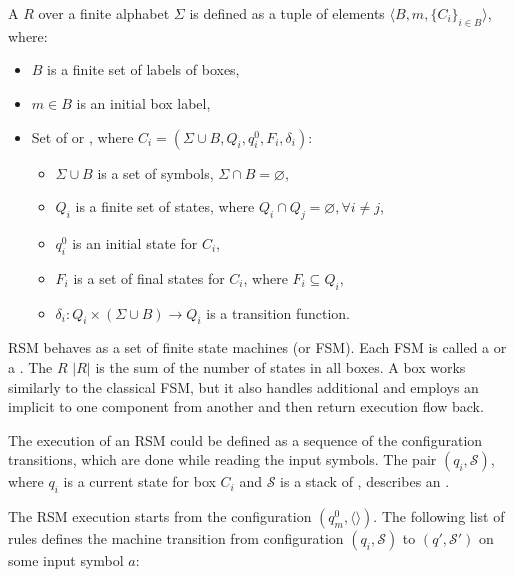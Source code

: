 \begin{definition}
A  $R$ over a finite alphabet $\Sigma$ is defined as a tuple of elements $\langle B,m,\{C_i\}_{i \in B} \rangle$, where:

\begin{itemize}
    \item $B$ is a finite set of labels of boxes,
    \item $m \in B$ is an initial box label,
    \item Set of  or ,
          where $C_i=(\Sigma \cup B, Q_i,q_i^0,F_i,\delta_i)$:
    \begin{itemize}
        \item $\Sigma \cup B$ is a set of symbols, $\Sigma \cap B = \varnothing$,
        \item $Q_i$ is a finite set of states,
              where $Q_i \cap Q_j =  \varnothing, \forall i \neq j$,
        \item $q_i^0$ is an initial state for $C_i$,
        \item $F_i$ is a set of final states for $C_i$, where $F_i \subseteq Q_i$,
        \item $\delta_i: Q_i \times (\Sigma \cup B) \to Q_i$ is a transition function. %
    \end{itemize}
\end{itemize}

\end{definition}

RSM behaves as a set of finite state machines (or FSM).
Each FSM is called a  or a . 
The  $R$ $|R|$ is the sum of the number of states in all boxes. 
A box works similarly to the classical FSM, but it also handles additional  and employs an implicit  to  one component from another and then return execution flow back.

The execution of an RSM could be defined as a sequence of the configuration transitions, which are done while reading the input symbols.
The pair $(q_i,\mathcal{S})$, where $q_i$ is a current state for box $C_i$ and $\mathcal{S}$ is  a stack of , describes an .

The RSM execution starts from the configuration $(q_m^0, \langle\rangle)$.
The following list of rules defines the machine transition from configuration $(q_i,\mathcal{S})$ to $(q',\mathcal{S}')$ on some input symbol $a$:

